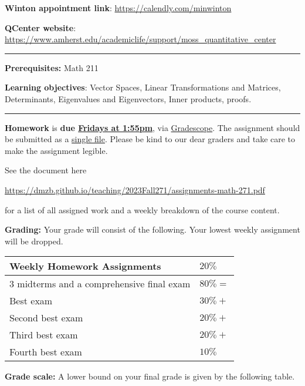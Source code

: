 \documentclass[12pt]{article}
\begin{document}
\noindent\textbf{Winton appointment link}: \url{https://calendly.com/minwinton}
\medskip

\noindent\textbf{QCenter website}: \url{https://www.amherst.edu/academiclife/support/moss_quantitative_center}

\medskip \hrule \medskip

\noindent\textbf{Prerequisites:} Math 211
\medskip

\noindent \textbf{Learning objectives}: Vector Spaces, Linear Transformations and Matrices, Determinants, Eigenvalues and Eigenvectors, Inner products, proofs.

\medskip \hrule \medskip

\noindent \textbf{Homework} is \textbf{due \underline{Fridays at 1:55pm}}, via \underline{Gradescope}. The assignment should be submitted as a \underline{single file}. Please be kind to our dear graders and take care to make the assignment legible.
\smallskip

\noindent See the document here
\begin{center}
 \url{https://dmzb.github.io/teaching/2023Fall271/assignments-math-271.pdf}
\end{center}
for a list of all assigned work and a weekly breakdown of the course content.
\medskip

\noindent\textbf{Grading:}
Your grade will consist of the following. Your lowest weekly assignment will be dropped.

\begin{center}
 \begin{tabular}{|l|l|}
 \hline
 Weekly Homework Assignments & $20\%$ \\
 \hline
 3 midterms and a comprehensive final exam & $80\% = $ 	 \\
 Best exam & $30\% + $ 	 \\
 Second best exam& $20\% + $ 	 \\
 Third best exam & $20\% + $ 	 \\
 Fourth best exam & $10\%$ 	 \\
 \hline
 \end{tabular}
\end{center}

\vspace*{.15in}
\noindent\textbf{Grade scale:}
A lower bound on your final grade is given by the following table.
\end{document}
